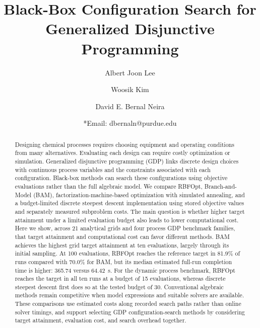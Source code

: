 \documentclass{article}
\title{Black-Box Configuration Search for Generalized Disjunctive Programming}
\author[1]{Albert Joon Lee\orcidB}
\author[2]{Woosik Kim\orcidC}
\author[1,*]{David E. Bernal Neira\orcidA}
\affil[1]{Davidson School of Chemical Engineering, Purdue University, West Lafayette, IN 47907, USA}
\affil[2]{Elmore Family School of Electrical and Computer Engineering, Purdue University, West Lafayette, IN 47907, USA}
\date{*Email: dbernaln@purdue.edu}
\begin{document}
\maketitle

\begin{abstract}
Designing chemical processes requires choosing equipment and operating conditions from many alternatives.
Evaluating each design can require costly optimization or simulation.
Generalized disjunctive programming (GDP) links discrete design choices with continuous process variables and the constraints associated with each configuration.
Black-box methods can search these configurations using objective evaluations rather than the full algebraic model.
We compare RBFOpt, Branch-and-Model (BAM), factorization-machine-based optimization with simulated annealing, and a budget-limited discrete steepest descent implementation using stored objective values and separately measured subproblem costs.
The main question is whether higher target attainment under a limited evaluation budget also leads to lower computational cost.
Here we show, across 21 analytical grids and four process GDP benchmark families, that target attainment and computational cost can favor different methods.
BAM achieves the highest grid target attainment at ten evaluations, largely through its initial sampling.
At 100 evaluations, RBFOpt reaches the reference target in 81.9\% of runs compared with 70.0\% for BAM, but its median estimated full-run completion time is higher: 365.74 versus 64.42~s.
For the dynamic process benchmark, RBFOpt reaches the target in all ten runs at a budget of 15 evaluations, whereas discrete steepest descent first does so at the tested budget of 30.
Conventional algebraic methods remain competitive when model expressions and suitable solvers are available.
These comparisons use estimated costs along recorded search paths rather than online solver timings, and support selecting GDP configuration-search methods by considering target attainment, evaluation cost, and search overhead together.
\end{abstract}
\end{document}

